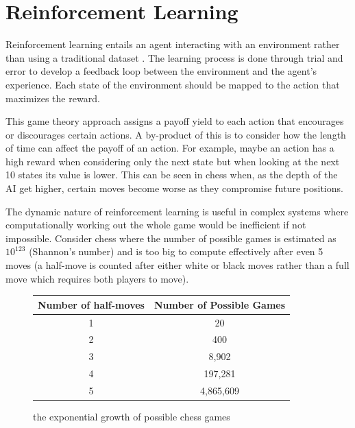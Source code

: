 \documentclass[10pt,a4paper]{report}
\begin{document}
	\chapter{Reinforcement Learning}
		Reinforcement learning entails an agent interacting with an environment rather than using a traditional dataset \autocite[p. 105]{DeepLearning}.
		The learning process is done through trial and error to develop a feedback loop between the environment and the agent's experience. Each state of the environment should be mapped to the action that maximizes the reward. \par
		This game theory approach assigns a payoff yield to each action that encourages or discourages certain actions.
		A by-product of this is to consider how the length of time can affect the payoff of an action. For example, maybe an action has
		a high reward when considering only the next state but when looking at the next 10 states its value is lower. This can be seen
		in chess when, as the depth of the AI get higher, certain moves become worse as they compromise future positions. \par
		The dynamic nature of reinforcement learning is useful in complex systems where computationally working out the whole game would be inefficient if not impossible.
		Consider chess \autocite{shannon1950xxii} where the number of possible games is estimated as $10^{123}$ (Shannon's number) and is too big to compute effectively after even 5 moves (a half-move is counted after
		either white or black moves rather than a full move which requires both players to move).
		\begin{figure}[h]
			\centering
			\begin{tabular}{||c c||}
				\hline
				Number of half-moves & Number of Possible Games\\ [0.5ex]
				\hline\hline
				1 & 20\\
				\hline
				2 & 400\\
				\hline
				3 & 8,902\\
				\hline
				4 & 197,281\\
				\hline
				5 & 4,865,609\\[1ex]
				\hline
			\end{tabular}
			\caption{the exponential growth of possible chess games}
			\label{fig:possible-chess-games}
		\end{figure}
\end{document}
